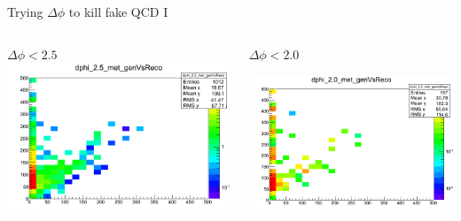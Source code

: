 \documentclass[8pt]{beamer}
\begin{document}
\begin{frame}{Trying $\Delta\phi$ to kill fake QCD I}
\begin{columns}
\begin{block}{$\Delta\phi<2.5$}
\centering
\includegraphics[width=\linewidth]{img/dphi_2p5_met_genVsReco.png} 
 
\end{block}

\begin{block}{$\Delta\phi<2.0$}
 
\centering
\includegraphics[width=\linewidth]{img/dphi_2p0_met_genVsReco.png} 
 
\end{block}


\end{columns}

\end{frame}
\end{document}
